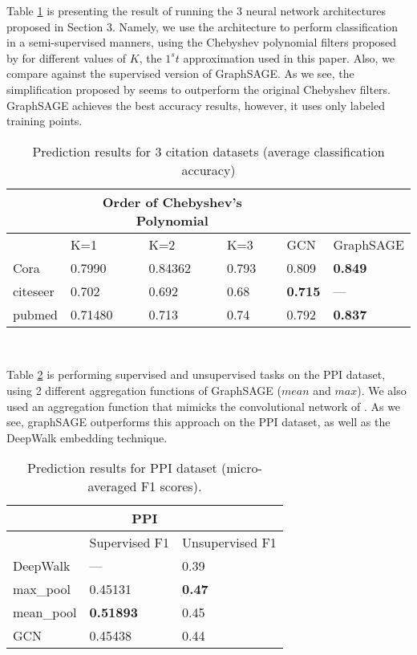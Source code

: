 Table \ref{table:2} is presenting the result of running the $3$ neural network
architectures proposed in Section  3. Namely, we use the \cite{kipf2016semi}
architecture to perform classification in a semi-supervised manners, using the
Chebyshev polynomial filters proposed by \cite{defferrard2016convolutional} for
different values of $K$, the $1^st$ approximation used in this paper. Also, we
compare against the supervised version of GraphSAGE. As we see, the
simplification proposed by \cite{kipf2016semi} seems to outperform the original
Chebyshev filters. GraphSAGE achieves the best accuracy results, however, it
uses only labeled training points.
\begin{table}[h!]
\centering
\caption{Prediction results for 3 citation datasets (average classification accuracy)}
\begin{tabular}{ |p{2cm}||p{2cm}|p{2cm}|p{2cm}|p{2cm}|p{2cm}|}
 \hline
 &\multicolumn{3}{c}{\textbf{Order of Chebyshev's Polynomial}} &&\\
 \hline
 &K=1& K=2 &K=3 &GCN & GraphSAGE\\
 \hline\hline
 Cora   & 0.7990    &0.84362 &0.793 &0.809 &\textbf{0.849}\\
 citeseer &   0.702  & 0.692 &0.68 &\textbf{0.715}& --- \\
 pubmed &0.71480 & 0.713 &0.74 &0.792 &\textbf{0.837}\\
 \hline
\end{tabular}\\
\label{table:2}
\end{table}

Table \ref{table:1} is performing supervised and unsupervised tasks on the PPI
dataset, using 2 different aggregation functions of GraphSAGE ($mean$ and
$max$). We also used an aggregation function that mimicks the convolutional
network of \cite{kipf2016semi}. As we see, graphSAGE outperforms this approach
on the PPI dataset, as well as the DeepWalk embedding technique.
\begin{table}[h!]
\centering
\caption{Prediction results for PPI dataset (micro-averaged F1 scores). \newline}
\begin{tabular}{|p{3cm}||p{3cm}|p{3cm}|}
 \hline
 \multicolumn{3}{|c|}{\textbf{PPI}} \\
 \hline
 & Supervised F1 &Unsupervised F1\\
 \hline\hline
 DeepWalk   & ---    &0.39\\
 max\_pool &   0.45131  & \textbf{0.47} \\
 mean\_pool &\textbf{0.51893} & 0.45\\
 GCN    &0.45438 & 0.44\\
 \hline
\end{tabular}\\
\label{table:1}
\end{table}


